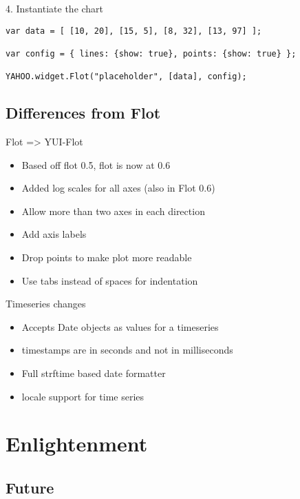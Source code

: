 \documentclass{beamer}
\begin{document}
\begin{frame}[fragile]{4. Instantiate the chart}
\begin{block}{}
\tiny{\begin{verbatim}
var data = [ [10, 20], [15, 5], [8, 32], [13, 97] ];

var config = { lines: {show: true}, points: {show: true} };

YAHOO.widget.Flot("placeholder", [data], config);
\end{verbatim}}
\end{block}
\end{frame}

\subsection{Differences from Flot}

\begin{frame}{Flot => YUI-Flot}
\begin{itemize}
\item Based off flot 0.5, flot is now at 0.6
\item Added log scales for all axes (also in Flot 0.6)
\item Allow more than two axes in each direction
\item Add axis labels
\item Drop points to make plot more readable
\item Use tabs instead of spaces for indentation
\end{itemize}
\end{frame}

\begin{frame}{Timeseries changes}
\begin{itemize}
\item Accepts Date objects as values for a timeseries
\item timestamps are in seconds and not in milliseconds
\item Full strftime based date formatter
\item locale support for time series
\end{itemize}
\end{frame}

\section{Enlightenment}
\subsection{Future}
\end{document}
